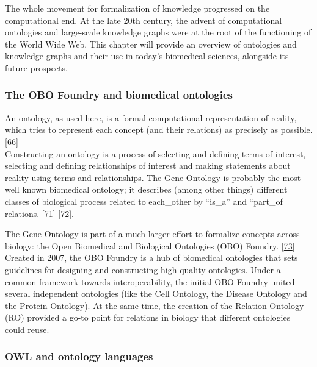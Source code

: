 The whole movement for formalization of knowledge progressed on the computational end. At the late 20th century, the advent of computational ontologies and large-scale knowledge graphs were at the root of the functioning of the World Wide Web.
This chapter will provide an overview of ontologies and knowledge graphs and their use in today's biomedical sciences, alongside its future prospects.

\hypertarget{the-obo-foundry-and-biomedical-ontologies}{%
\subsubsection{The OBO Foundry and biomedical ontologies}\label{the-obo-foundry-and-biomedical-ontologies}}

An ontology, as used here, is a formal computational representation of reality, which tries to represent each concept (and their relations) as precisely as possible. {[}\protect\hyperlink{ref-DLTMbf54}{66}{]}\\
Constructing an ontology is a process of selecting and defining terms of interest, selecting and defining relationships of interest and making statements about reality using terms and relationships.
The Gene Ontology is probably the most well known biomedical ontology; it describes (among other things) different classes of biological process related to each\_other by ``is\_a'' and ``part\_of relations. {[}\protect\hyperlink{ref-18wkLcGxT}{71}{]} {[}\protect\hyperlink{ref-2KmDs8gy}{72}{]}.

The Gene Ontology is part of a much larger effort to formalize concepts across biology: the Open Biomedical and Biological Ontologies (OBO) Foundry. {[}\protect\hyperlink{ref-j3tJyG7J}{73}{]}
Created in 2007, the OBO Foundry is a hub of biomedical ontologies that sets guidelines for designing and constructing high-quality ontologies.
Under a common framework towards interoperability, the initial OBO Foundry united several independent ontologies (like the Cell Ontology, the Disease Ontology and the Protein Ontology).
At the same time, the creation of the Relation Ontology (RO) provided a go-to point for relations in biology that different ontologies could reuse.

\hypertarget{owl-and-ontology-languages}{%
\subsubsection{OWL and ontology languages}\label{owl-and-ontology-languages}}

